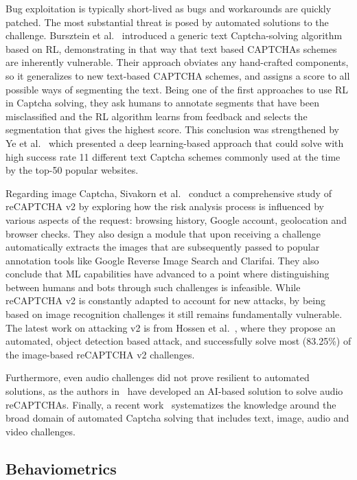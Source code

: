 Bug exploitation is typically short-lived as bugs and workarounds are quickly patched.
The most substantial threat is posed by automated solutions to the challenge.
Bursztein et al.~\cite{bursztein2014end} introduced a generic text Captcha-solving algorithm based on \gls{RL}, demonstrating in that way that text based CAPTCHAs schemes are inherently vulnerable.
Their approach obviates any hand-crafted components, so it generalizes to new text-based CAPTCHA schemes, and assigns a score to all possible ways of segmenting the text.
Being one of the first approaches to use \gls{RL} in Captcha solving, they ask humans to annotate segments that have been misclassified and the \gls{RL} algorithm learns from feedback and selects the segmentation that gives the highest score.
This conclusion was strengthened by Ye et al.~\cite{ye2018yet} which presented a deep learning-based approach that could solve with high success rate 11 different text Captcha schemes commonly used at the time by the top-50 popular websites.

Regarding image Captcha, Sivakorn et al.~\cite{sivakorn2016robot} conduct a comprehensive study of reCAPTCHA v2 by exploring how the risk analysis process is influenced by various aspects of the request: browsing history, Google account, geolocation and browser checks.
They also design a module that upon receiving a challenge automatically extracts the images that are subsequently passed to popular annotation tools like Google Reverse Image Search and Clarifai.
They also conclude that \gls{ML} capabilities have advanced to a point where distinguishing between humans and bots through such challenges is infeasible.
While reCAPTCHA v2 is constantly adapted to account for new attacks, by being based on image recognition challenges it still remains fundamentally vulnerable.
The latest work on attacking v2 is from Hossen et al.~\cite{hossen2020object}, where they propose an automated, object detection based attack, and successfully solve most (83.25\%) of the image-based reCAPTCHA v2 challenges.

Furthermore, even audio challenges did not prove resilient to automated solutions, as the authors in~\cite{bock2017uncaptcha} have developed an AI-based solution to solve audio reCAPTCHAs.
Finally, a recent work~\cite{dionysiou2020sok} systematizes the knowledge around the broad domain of automated Captcha solving that includes text, image, audio and video challenges.

\subsection{Behaviometrics}

